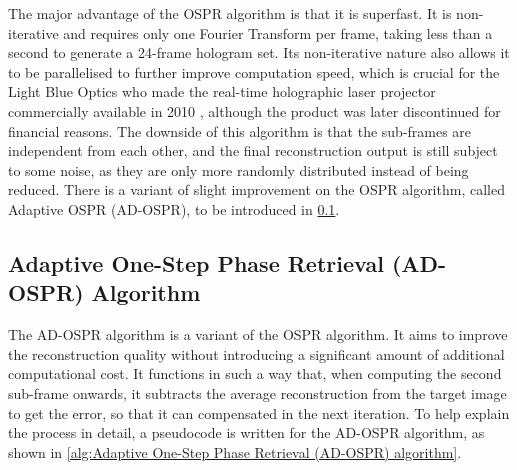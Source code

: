 The major advantage of the OSPR algorithm is that it is superfast. It is non-iterative and requires only one Fourier Transform per frame, taking less than a second to generate a 24-frame hologram set. Its non-iterative nature also allows it to be parallelised to further improve computation speed, which is crucial for the Light Blue Optics who made the real-time holographic laser projector commercially available in 2010 \cite{Buckley2008}, although the product was later discontinued for financial reasons. The downside of this algorithm is that the sub-frames are independent from each other, and the final reconstruction output is still subject to some noise, as they are only more randomly distributed instead of being reduced. There is a variant of slight improvement on the OSPR algorithm, called Adaptive OSPR (AD-OSPR), to be introduced in \cref{sec:Adaptive One-Step Phase Retrieval (AD-OSPR) Algorithm}.



\subsection{Adaptive One-Step Phase Retrieval (AD-OSPR) Algorithm}\label{sec:Adaptive One-Step Phase Retrieval (AD-OSPR) Algorithm}

The AD-OSPR algorithm \cite{Kaczorowski2016} is a variant of the OSPR algorithm. It aims to improve the reconstruction quality without introducing a significant amount of additional computational cost. It functions in such a way that, when computing the second sub-frame onwards, it subtracts the average reconstruction from the target image to get the error, so that it can compensated in the next iteration. To help explain the process in detail, a pseudocode is written for the AD-OSPR algorithm, as shown in \cref{alg:Adaptive One-Step Phase Retrieval (AD-OSPR) algorithm}.


